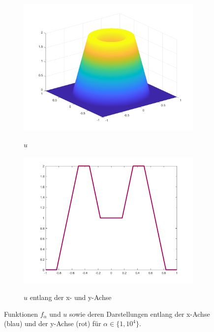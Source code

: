 \begin{figure}[p]
  \begin{subfigure}[b]{.48\linewidth}
    \centering
    \caption{$u$}
    \includegraphics[trim = 40 30 30 30, clip, width=\linewidth]
      {pictures/chapExperiments/secGeneralInfo/f01Plots/exactSolution.png}
    \label{fig:f01ExactSol}
  \end{subfigure}
  \quad
  \begin{subfigure}[b]{.48\linewidth}
    \centering
    \caption{$u$ entlang der x- und y-Achse}
    \includegraphics[trim = 50 30 50 20, clip, width=\linewidth]
      {pictures/chapExperiments/secGeneralInfo/f01Plots/exactSolutionAxis.png}
    \label{fig:f01ExactSolAxis}
  \end{subfigure} 
  \caption{Funktionen $f_\alpha$ und $u$ sowie deren
  Darstellungen entlang der x-Achse (blau) und der y-Achse (rot) für
  $\alpha\in\{1,10^4\}$.}
  \label{fig:f01Plots}
\end{figure}
